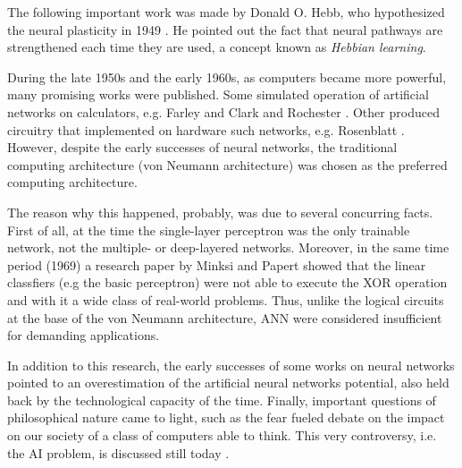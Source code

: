 The following important work was made by Donald O. Hebb, who hypothesized the neural plasticity in 1949 \cite{hebb1949organization}.
He pointed out the fact that neural pathways are strengthened each time they are used, a concept known as \textit{Hebbian learning}.

During the late 1950s and the early 1960s, as computers became more powerful, many promising works were published.
Some simulated operation of artificial networks on calculators, e.g. Farley and Clark \cite{Farley1954} and Rochester \cite{Rochester1956}.
Other produced circuitry that implemented on hardware such networks, e.g. Rosenblatt \cite{frank1957perceptron,Rosenblatt1958}.
However, despite the early successes of neural networks, the traditional computing architecture (von Neumann architecture) was chosen as the preferred computing architecture.

The reason why this happened, probably, was due to several concurring facts.
First of all, at the time the single-layer perceptron was the only trainable network, not the multiple- or deep-layered networks.
Moreover, in the same time period (1969) a research paper by Minksi and Papert \cite{minski1969perceptrons} showed that the linear classfiers (e.g the basic perceptron) were not able to execute the \ac{XOR} operation and with it a wide class of real-world problems.
Thus, unlike the logical circuits at the base of the von Neumann architecture, \ac{ANN} were considered insufficient for demanding applications.



In addition to this research, the early successes of some works on neural networks pointed to an overestimation of the artificial neural networks potential, also held back by the technological capacity of the time.
Finally, important questions of philosophical nature came to light, such as the fear fueled debate on the impact on our society of a class of computers able to think.
This very controversy, i.e. the \ac{AI} problem, is discussed still today \cite{stanford.edu}.

